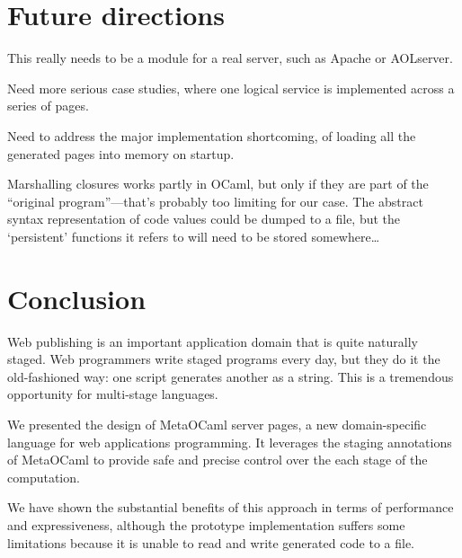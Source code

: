 \documentclass[preprint]{acm_proc_article-sp}
\def\MOC{MetaOCaml}
\begin{document}
\newpage
\section{Future directions}
\label{sec:future}

  
 This really needs to be a module for a real server, such
  as Apache or AOLserver.
  
 Need more serious case studies, where one logical service
  is implemented across a series of pages.
  
 Need to address the major implementation shortcoming, of
  loading all the generated pages into memory on startup.
  
  Marshalling closures works partly in OCaml, but only if they
  are part of the ``original program''---that's probably too
  limiting for our case.  The abstract syntax representation of
  code values could be dumped to a file, but the `persistent'
  functions it refers to will need to be stored somewhere\ldots



\section{Conclusion}
\label{sec:concl}

Web publishing is an important application domain that is quite
naturally staged.  Web programmers write staged programs every
day, but they do it the old-fashioned way: one script generates
another as a string.  This is a tremendous opportunity for
multi-stage languages.

We presented the design of \MOC{} server pages, a new
domain-specific language for web applications programming.  It
leverages the staging annotations of \MOC{} to provide safe and
precise control over the each stage of the computation.

We have shown the substantial benefits of this approach in terms
of performance and expressiveness, although the prototype
implementation suffers some limitations because it is unable to
read and write generated code to a file.


\raggedright

\end{document}
